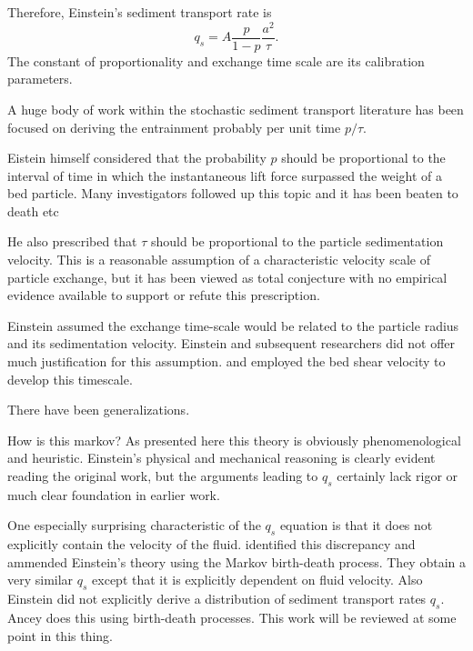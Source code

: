 Therefore, Einstein's sediment transport rate is 
$$ q_s = A \frac{p}{1-p} \frac{a^2}{\tau}. $$ 
The constant of proportionality and exchange time scale are its calibration parameters. 

A huge body of work within the stochastic sediment transport literature has been focused on deriving the entrainment probably per unit time $p/\tau$. 

Eistein himself considered that the probability $p$ should be proportional to the interval of time in which the instantaneous lift force surpassed the weight of a bed particle. 
Many investigators followed up this topic and it has been beaten to death \citep{Grass1970, Paintal1969, Paintal1971} etc 

He also prescribed that $\tau$ should be proportional to the particle sedimentation velocity. This is a reasonable assumption of a characteristic velocity scale of particle exchange, but it has been viewed as total conjecture with no empirical evidence available to support or refute this prescription. 

Einstein assumed the exchange time-scale would be related to the particle radius and its sedimentation velocity. Einstein and subsequent researchers did not offer much justification for this assumption. \citep{Cheng2004} and \citet{Paintal1971} employed the bed shear velocity to develop this timescale.

There have been generalizations. 

How is this markov? As presented here this theory is obviously phenomenological and heuristic. 
Einstein's physical and mechanical reasoning is clearly evident reading the original work, but the arguments leading to $q_s$ certainly lack rigor or much clear foundation in earlier work. 

One especially surprising characteristic of the $q_s$ equation is that it does not explicitly contain the velocity of the fluid. 
\citet{Ancey2008} identified this discrepancy and ammended Einstein's theory using the Markov birth-death process. 
They obtain a very similar $q_s$ except that it is explicitly dependent on fluid velocity. 
Also Einstein did not explicitly derive a distribution of sediment transport rates $q_s$. Ancey does this using birth-death processes. 
This work will be reviewed at some point in this thing. 
